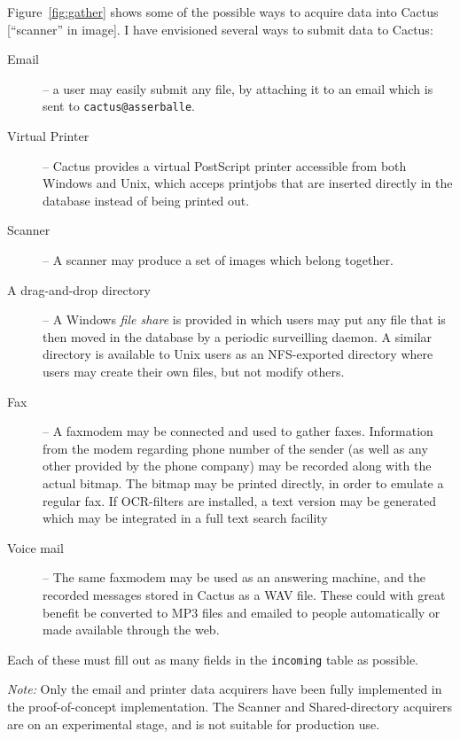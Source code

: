 Figure~\vref{fig:gather} shows some of the possible ways to acquire
data into Cactus [\textsf{``scanner'' in image}].  I have envisioned
several ways to submit data to Cactus:

\begin{description}
\item[Email] -- a user may easily submit any file, by
  attaching it to an email which is sent to
  \texttt{cactus@asserballe}. 

\item[Virtual Printer] -- Cactus provides a virtual
  PostScript printer accessible from both Windows and Unix,
  which acceps printjobs that are inserted directly in the
  database instead of being printed out.

\item[Scanner] -- A scanner may produce a set of images
  which belong together.  

\item[A drag-and-drop directory] -- A Windows \textit{file share} is provided
in which users may put any file that is then moved in the database by a
periodic surveilling daemon.  A similar directory is available to Unix users as
an NFS-exported directory where users may create their own files, but not
modify others.  


\item[Fax] -- A faxmodem may be connected and used to gather
  faxes.  Information from the modem regarding phone number
  of the sender (as well as any other provided by the phone
  company) may be recorded along with the actual bitmap.
  The bitmap may be printed directly, in order to emulate a
  regular fax.  If OCR-filters are installed, a text
  version may be generated which may be integrated in a full
  text search facility
  
\item[Voice mail] -- The same faxmodem may be used as an
  answering machine, and the recorded messages stored in
  Cactus as a WAV file.  These could with great benefit be
  converted to MP3 files and emailed to people automatically or made available through the web. 

\end{description}

Each of these must fill out as many fields in the
\texttt{incoming} table as possible.  

\textit{Note:} Only the email and printer data acquirers have been fully
implemented in the proof-of-concept implementation.  The Scanner and
Shared-directory acquirers are on an experimental stage, and is not suitable
for production use.


